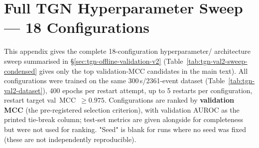 \section{Full TGN Hyperparameter Sweep — 18 Configurations}
\label{app:tgn-full-sweep}

This appendix gives the complete 18-configuration hyperparameter/
architecture sweep summarised in
\S\ref{sec:tgn-offline-validation-v2} (Table~\ref{tab:tgn-val2-sweep-condensed}
gives only the top validation-MCC candidates in the main text). All
configurations were trained on the same 300\,s/2361-event dataset
(Table~\ref{tab:tgn-val2-dataset}), 400 epochs per restart attempt, up to
5 restarts per configuration, restart target val~MCC~$\geq 0.975$.
Configurations are ranked by \textbf{validation MCC} (the pre-registered
selection criterion), with validation AUROC as the printed tie-break
column; test-set metrics are given alongside for completeness but were
not used for ranking. "Seed" is blank for runs where no seed was fixed
(these are not independently reproducible).

